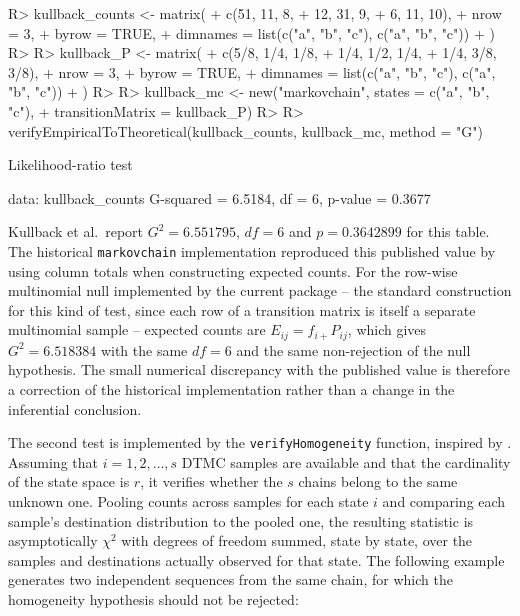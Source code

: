 \documentclass[
  nojss]{jss}
\begin{document}
\begin{CodeChunk}
\begin{CodeInput}
R> kullback_counts <- matrix(
+   c(51, 11,  8,
+     12, 31,  9,
+      6, 11, 10),
+   nrow = 3,
+   byrow = TRUE,
+   dimnames = list(c("a", "b", "c"), c("a", "b", "c"))
+ )
R> 
R> kullback_P <- matrix(
+   c(5/8, 1/4, 1/8,
+     1/4, 1/2, 1/4,
+     1/4, 3/8, 3/8),
+   nrow = 3,
+   byrow = TRUE,
+   dimnames = list(c("a", "b", "c"), c("a", "b", "c"))
+ )
R> 
R> kullback_mc <- new("markovchain", states = c("a", "b", "c"),
+                    transitionMatrix = kullback_P)
R> 
R> verifyEmpiricalToTheoretical(kullback_counts, kullback_mc, method = "G")
\end{CodeInput}
\begin{CodeOutput}

    Likelihood-ratio test

data:  kullback_counts
G-squared = 6.5184, df = 6, p-value = 0.3677
\end{CodeOutput}
\end{CodeChunk}

Kullback et al.~report \(G^2=6.551795\), \(df=6\) and \(p=0.3642899\) for this table. The historical \texttt{markovchain} implementation reproduced this published value by using column totals when constructing expected counts. For the row-wise multinomial null implemented by the current package -- the standard construction for this kind of test, since each row of a transition matrix is itself a separate multinomial sample -- expected counts are \(E_{ij}=f_{i+}P_{ij}\), which gives \(G^2=6.518384\) with the same \(df=6\) and the same non-rejection of the null hypothesis. The small numerical discrepancy with the published value is therefore a correction of the historical implementation rather than a change in the inferential conclusion.

The second test is implemented by the \texttt{verifyHomogeneity} function, inspired by \cite[section~9]{kullback1962tests}. Assuming that \(i=1,2, \ldots, s\) DTMC samples are available and that the cardinality of the state space is \(r\), it verifies whether the \(s\) chains belong to the same unknown one. Pooling counts across samples for each state \(i\) and comparing each sample's destination distribution to the pooled one, the resulting statistic is asymptotically \(\chi^2\) with degrees of freedom summed, state by state, over the samples and destinations actually observed for that state. The following example generates two independent sequences from the same chain, for which the homogeneity hypothesis should not be rejected:
\end{document}
